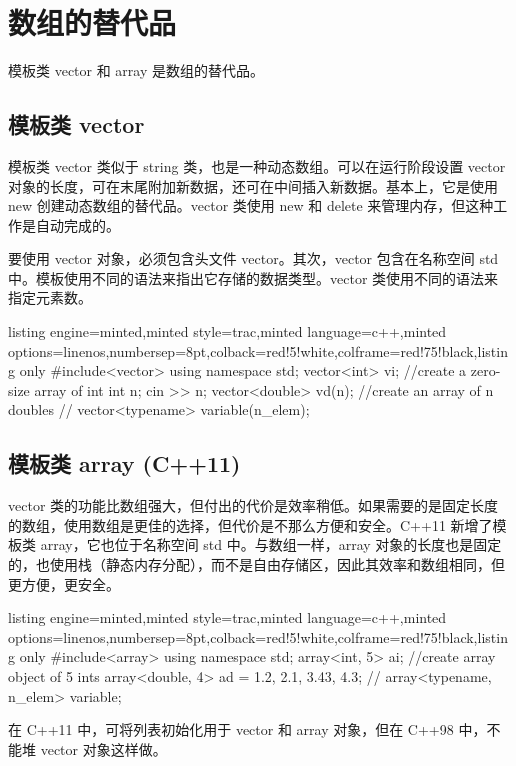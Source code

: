 \section{数组的替代品}
模板类 vector 和 array 是数组的替代品。
\subsection{模板类 vector}
模板类 vector 类似于 string 类，也是一种动态数组。可以在运行阶段设置 vector 对象的长度，可在末尾附加新数据，还可在中间插入新数据。基本上，它是使用 new 创建动态数组的替代品。vector 类使用 new 和 delete 来管理内存，但这种工作是自动完成的。

要使用 vector 对象，必须包含头文件 vector。其次，vector 包含在名称空间 std 中。模板使用不同的语法来指出它存储的数据类型。vector 类使用不同的语法来指定元素数。
\begin{tcblisting}{listing engine=minted,minted style=trac,minted language=c++,minted options={linenos,numbersep=8pt},colback=red!5!white,colframe=red!75!black,listing only}
#include<vector>
using namespace std;
vector<int> vi;     //create a zero-size array of int
int n;
cin >> n;
vector<double> vd(n);  //create an array of n doubles
// vector<typename> variable(n_elem);
\end{tcblisting}

\subsection{模板类 array (C++11)}
vector 类的功能比数组强大，但付出的代价是效率稍低。如果需要的是固定长度的数组，使用数组是更佳的选择，但代价是不那么方便和安全。C++11 新增了模板类 array，它也位于名称空间 std 中。与数组一样，array 对象的长度也是固定的，也使用栈（静态内存分配），而不是自由存储区，因此其效率和数组相同，但更方便，更安全。
\begin{tcblisting}{listing engine=minted,minted style=trac,minted language=c++,minted options={linenos,numbersep=8pt},colback=red!5!white,colframe=red!75!black,listing only}
#include<array>
using namespace std;
array<int, 5> ai; //create array object of 5 ints
array<double, 4> ad = {1.2, 2.1, 3.43, 4.3};
// array<typename, n_elem> variable;
\end{tcblisting} 
在 C++11 中，可将列表初始化用于 vector 和 array 对象，但在 C++98 中，不能堆 vector 对象这样做。